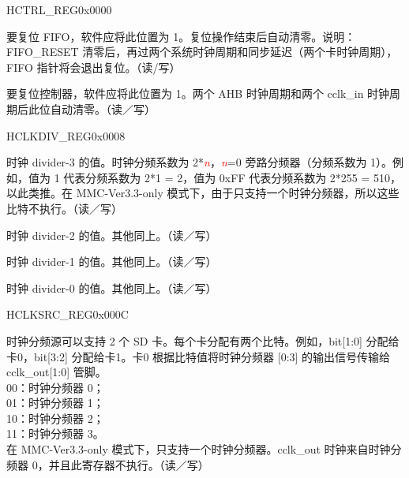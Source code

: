 \addtocounter{Regfloat}{-1}
\begin{register}{H}{CTRL\_REG}{0x0000}
\begin{regdesc}\begin{reglist}
\item [继上一页寄存器描述。]
\item [FIFO\_RESET]要复位 FIFO，软件应将此位置为 1。复位操作结束后自动清零。说明：FIFO\_RESET 清零后，再过两个系统时钟周期和同步延迟（两个卡时钟周期），FIFO 指针将会退出复位。（读/写）
\item [CONTROLLER\_RESET]要复位控制器，软件应将此位置为 1。两个 AHB 时钟周期和两个 cclk\_in 时钟周期后此位自动清零。（读／写）
\end{reglist}\end{regdesc}
\end{register}

\begin{register}{H}{CLKDIV\_REG}{0x0008}\label{regdesc:CLKDIVREG}
%
%
%
%
\regnewline%
\begin{regdesc}\begin{reglist}
\item [CLK\_DIVIDER3]时钟 divider-3 的值。时钟分频系数为 2*\textcolor{red}{\it{n}}，\textcolor{red}{\it{n}}=0 旁路分频器（分频系数为 1）。例如，值为 1 代表分频系数为 2*1 = 2，值为 0xFF 代表分频系数为 2*255 = 510，以此类推。在 MMC-Ver3.3-only 模式下，由于只支持一个时钟分频器，所以这些比特不执行。（读／写）
\item [CLK\_DIVIDER2]时钟 divider-2 的值。其他同上。（读／写）
\item [CLK\_DIVIDER1]时钟 divider-1 的值。其他同上。（读／写）
\item [CLK\_DIVIDER0]时钟 divider-0 的值。其他同上。（读／写）
\end{reglist}\end{regdesc}
\end{register}


\begin{register}{H}{CLKSRC\_REG}{0x000C}\label{regdesc:CLKSRCREG}
%
%
\regnewline%
\begin{regdesc}\begin{reglist}
\item [CLKSRC\_REG]时钟分频源可以支持 2 个 SD 卡。每个卡分配有两个比特。例如，bit[1:0] 分配给卡0，bit[3:2] 分配给卡1。卡0 根据比特值将时钟分频器 [0:3] 的输出信号传输给 cclk\_out[1:0] 管脚。\\
00：时钟分频器 0；\\
01：时钟分频器 1；\\
10：时钟分频器 2；\\
11：时钟分频器 3。\\
在 MMC-Ver3.3-only 模式下，只支持一个时钟分频器。cclk\_out 时钟来自时钟分频器 0，并且此寄存器不执行。（读／写）
\end{reglist}\end{regdesc}
\end{register}


